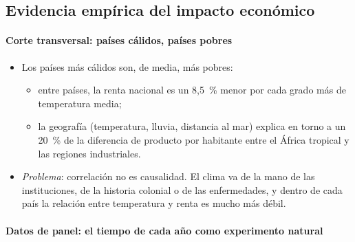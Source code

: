 \documentclass[11pt]{article}
\begin{document}
\subsection{Evidencia empírica del impacto económico}\label{sec:evidencia}

\paragraph{Corte transversal: países cálidos, países pobres}

\begin{itemize}
\item Los países más cálidos son, de media, más pobres:
  \begin{itemize}
  \item entre países, la renta nacional es un 8,5~\% menor por cada grado más de temperatura media\nocite{DellJonesOlken2009Temperature};
  \item la geografía (temperatura, lluvia, distancia al mar) explica en torno a un 20~\% de la diferencia de producto por habitante entre el África tropical y las regiones industriales\nocite{Nordhaus2006Geography}.
  \end{itemize}
\item \emph{Problema}: correlación no es causalidad. El clima va de la mano de las instituciones, de la historia colonial o de las enfermedades, y dentro de cada país la relación entre temperatura y renta es mucho más débil\nocite{DellJonesOlken2009Temperature}.
\end{itemize}

\paragraph{Datos de panel: el tiempo de cada año como experimento natural}
\end{document}
